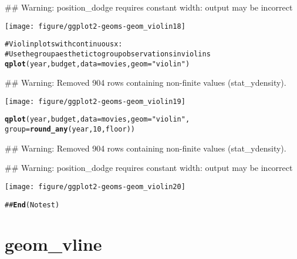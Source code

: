 \documentclass[a4paper,titlepage]{tufte-handout}\usepackage{graphicx, color}
\makeatletter
\def\maxwidth{ %
  \ifdim\Gin@nat@width>\linewidth
    \linewidth
  \else
    \Gin@nat@width
  \fi
}
\newcommand{\hlfunctioncall}[1]{\textcolor[rgb]{0.501960784313725,0,0.329411764705882}{\textbf{#1}}}%
\newcommand{\hlstring}[1]{\textcolor[rgb]{0.6,0.6,1}{#1}}%
\newcommand{\hlcomment}[1]{\textcolor[rgb]{0.180392156862745,0.6,0.341176470588235}{#1}}%
\newenvironment{kframe}{%
 \def\at@end@of@kframe{}%
 \ifinner\ifhmode%
  \def\at@end@of@kframe{\end{minipage}}%
  \begin{minipage}{\columnwidth}%
 \fi\fi%
 \def\FrameCommand##1{\hskip\@totalleftmargin \hskip-\fboxsep
 \colorbox{shadecolor}{##1}\hskip-\fboxsep
     \hskip-\linewidth \hskip-\@totalleftmargin \hskip\columnwidth}%
 \MakeFramed {\advance\hsize-\width
   \@totalleftmargin\z@ \linewidth\hsize
   \@setminipage}}%
 {\par\unskip\endMakeFramed%
 \at@end@of@kframe}
\newenvironment{knitrout}{}{} %
\makeatother
\begin{document}
\begin{knitrout}
\begin{kframe}
{\ttfamily\noindent\textcolor{warningcolor}{\#\# Warning: position\_dodge requires constant width: output may be incorrect}}\end{kframe}\texttt{[image: figure/ggplot2-geoms-geom\_violin18]} \begin{kframe}\begin{alltt}
\hlcomment{# Violin plots with continuous x:}
\hlcomment{# Use the group aesthetic to group observations in violins}
\hlfunctioncall{qplot}(year, budget, data = movies, geom = \hlstring{"violin"})
\end{alltt}


{\ttfamily\noindent\textcolor{warningcolor}{\#\# Warning: Removed 904 rows containing non-finite values (stat\_ydensity).}}\end{kframe}\texttt{[image: figure/ggplot2-geoms-geom\_violin19]} \begin{kframe}\begin{alltt}
\hlfunctioncall{qplot}(year, budget, data = movies, geom = \hlstring{"violin"},
  group = \hlfunctioncall{round_any}(year, 10, floor))
\end{alltt}


{\ttfamily\noindent\textcolor{warningcolor}{\#\# Warning: Removed 904 rows containing non-finite values (stat\_ydensity).}}

{\ttfamily\noindent\textcolor{warningcolor}{\#\# Warning: position\_dodge requires constant width: output may be incorrect}}\end{kframe}\texttt{[image: figure/ggplot2-geoms-geom\_violin20]} \begin{kframe}\begin{alltt}
\hlcomment{## \hlfunctioncall{End}(No test)}
\end{alltt}
\end{kframe}
\end{knitrout}


\section{geom\_vline}
\end{document}
